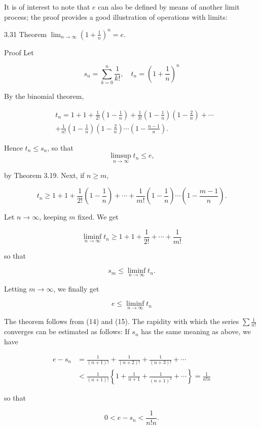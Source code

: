\documentclass[10pt]{article}
\begin{document}
It is of interest to note that $e$ can also be defined by means of another limit process; the proof provides a good illustration of operations with limits:

3.31 Theorem $\lim _{n \rightarrow \infty}\left(1+\frac{1}{n}\right)^{n}=e$.

Proof Let

$$
s_{n}=\sum_{k=0}^{n} \frac{1}{k !}, \quad t_{n}=\left(1+\frac{1}{n}\right)^{n}
$$

By the binomial theorem,

$$
\begin{aligned}
& t_{n}=1+1+\frac{1}{2 !}\left(1-\frac{1}{n}\right)+\frac{1}{3 !}\left(1-\frac{1}{n}\right)\left(1-\frac{2}{n}\right)+\cdots \\
& +\frac{1}{n !}\left(1-\frac{1}{n}\right)\left(1-\frac{2}{n}\right) \cdots\left(1-\frac{n-1}{n}\right) .
\end{aligned}
$$

Hence $t_{n} \leq s_{n}$, so that$$
\limsup _{n \rightarrow \infty} t_{n} \leq e,
$$

by Theorem 3.19. Next, if $n \geq m$,

$$
t_{n} \geq 1+1+\frac{1}{2 !}\left(1-\frac{1}{n}\right)+\cdots+\frac{1}{m !}\left(1-\frac{1}{n}\right) \cdots\left(1-\frac{m-1}{n}\right) .
$$

Let $n \rightarrow \infty$, keeping $m$ fixed. We get

$$
\liminf _{n \rightarrow \infty} t_{n} \geq 1+1+\frac{1}{2 !}+\cdots+\frac{1}{m !}
$$

so that

$$
s_{m} \leq \liminf _{n \rightarrow \infty} t_{n} .
$$

Letting $m \rightarrow \infty$, we finally get

$$
e \leq \liminf _{n \rightarrow \infty} t_{n}
$$

The theorem follows from (14) and (15). The rapidity with which the series $\sum \frac{1}{n !}$ converges can be estimated as follows: If $s_{n}$ has the same meaning as above, we have

$$
\begin{aligned}
e-s_{n} & =\frac{1}{(n+1) !}+\frac{1}{(n+2) !}+\frac{1}{(n+3) !}+\cdots \\
& <\frac{1}{(n+1) !}\left\{1+\frac{1}{n+1}+\frac{1}{(n+1)^{2}}+\cdots\right\}=\frac{1}{n ! n}
\end{aligned}
$$

so that

$$
0<e-s_{n}<\frac{1}{n ! n} .
$$
\end{document}
